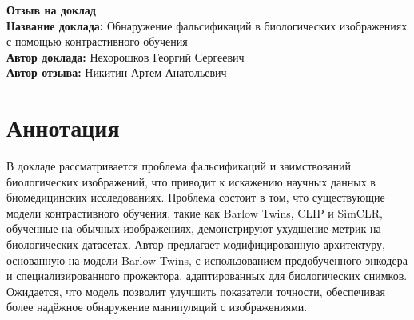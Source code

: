\documentclass[11pt]{article}
\begin{document}
\begin{center}
    {\Large \textbf{Отзыв на доклад}}\\[1em]
    {\large \textbf{Название доклада:} Обнаружение фальсификаций в биологических изображениях с помощью контрастивного обучения}\\[0.5em]
    {\large \textbf{Автор доклада:} Нехорошков Георгий Сергеевич}\\[0.5em]
    {\large \textbf{Автор отзыва:} Никитин Артем Анатольевич}\\[2em]
\end{center}

\section*{Аннотация}
В докладе рассматривается проблема фальсификаций и заимствований биологических изображений,
что приводит к искажению научных данных в биомедицинских исследованиях. Проблема состоит в том,
что существующие модели контрастивного обучения, такие как Barlow Twins, CLIP и SimCLR, обученные на обычных изображениях,
демонстрируют ухудшение метрик на биологических датасетах. Автор предлагает модифицированную архитектуру, основанную на
модели Barlow Twins, с использованием предобученного энкодера и специализированного прожектора,
адаптированных для биологических снимков. Ожидается, что модель позволит улучшить показатели точности,
обеспечивая более надёжное обнаружение манипуляций с изображениями.

\end{document}
